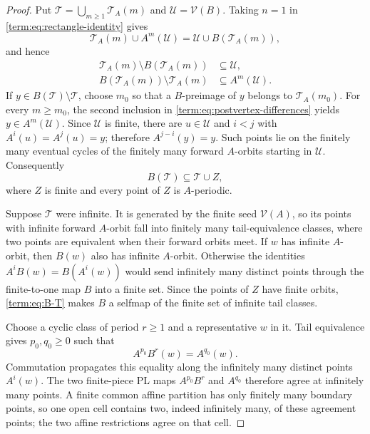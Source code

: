 \documentclass[11pt]{article}
\theoremstyle{definition}
\theoremstyle{remark}
\begin{document}
\begin{proof}
Put
$\mathcal T=\bigcup_{m\geq1}\mathcal T_A(m)$ and
$\mathcal U=\mathcal V(B)$.  Taking $n=1$ in
\eqref{term:eq:rectangle-identity} gives
\[
 \mathcal T_A(m)\cup A^m(\mathcal U)
 =\mathcal U\cup B(\mathcal T_A(m)),
\]
and hence
\begin{equation}\label{term:eq:postvertex-differences}
\begin{aligned}
 \mathcal T_A(m)\setminus B(\mathcal T_A(m))&\subseteq\mathcal U,\\
 B(\mathcal T_A(m))\setminus\mathcal T_A(m)&\subseteq A^m(\mathcal U).
\end{aligned}
\end{equation}
If $y\in B(\mathcal T)\setminus\mathcal T$, choose $m_0$ so that a
$B$-preimage of $y$ belongs to $\mathcal T_A(m_0)$.  For every
$m\geq m_0$, the second inclusion in
\eqref{term:eq:postvertex-differences} yields $y\in A^m(\mathcal U)$.
Since $\mathcal U$ is finite, there are $u\in\mathcal U$ and $i<j$ with
$A^i(u)=A^j(u)=y$; therefore $A^{j-i}(y)=y$.  Such points lie on the finitely
many eventual cycles of the finitely many forward $A$-orbits starting in
$\mathcal U$.  Consequently
\begin{equation}\label{term:eq:B-T}
 B(\mathcal T)\subseteq\mathcal T\cup Z,
\end{equation}
where $Z$ is finite and every point of $Z$ is $A$-periodic.

Suppose $\mathcal T$ were infinite.  It is generated by the finite seed
$\mathcal V(A)$, so its points with infinite forward $A$-orbit fall into
finitely many tail-equivalence classes, where two points are equivalent when
their forward orbits meet.  If $w$ has infinite $A$-orbit, then $B(w)$ also
has infinite $A$-orbit.  Otherwise the identities
$A^iB(w)=B(A^i(w))$ would send infinitely many distinct points through the
finite-to-one map $B$ into a finite set.  Since the points of $Z$ have finite
orbits, \eqref{term:eq:B-T} makes $B$ a selfmap of the finite set of
infinite tail classes.

Choose a cyclic class of period $r\geq1$ and a representative $w$ in it.
Tail equivalence gives $p_0,q_0\geq0$ such that
\begin{equation}\label{term:eq:tail-relation}
 A^{p_0}B^r(w)=A^{q_0}(w).
\end{equation}
Commutation propagates this equality along the infinitely many distinct
points $A^i(w)$.  The two finite-piece PL maps
$A^{p_0}B^r$ and $A^{q_0}$ therefore agree at infinitely many points.  A
finite common affine partition has only finitely many boundary points, so
one open cell contains two, indeed infinitely many, of these agreement
points; the two affine restrictions agree on that cell.


\end{proof}
\end{document}
